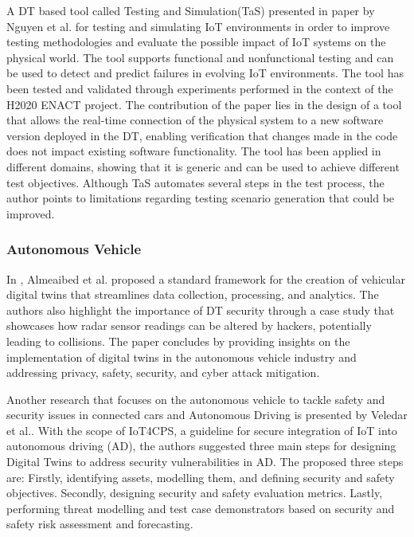 A DT based tool called Testing and Simulation(TaS) presented in\cite{luongnguyenDigitalTwinIoT2022} paper by Nguyen et al. for testing and simulating IoT environments in order to improve testing methodologies and evaluate the possible impact of IoT systems on the physical world. The tool supports functional and nonfunctional testing and can be used to detect and predict failures in evolving IoT environments. The tool has been tested and validated through experiments performed in the context of the H2020 ENACT project. The contribution of the paper lies in the design of a tool that allows the real-time connection of the physical system to a new software version deployed in the DT, enabling verification that changes made in the code does not impact existing software functionality. The tool has been applied in different domains, showing that it is generic and can be used to achieve different test objectives. Although TaS automates several steps in the test process, the author points to limitations regarding testing scenario generation that could be improved.


\subsubsection{Autonomous Vehicle}
In \cite{almeaibedDigitalTwinAnalysis2021}, Almeaibed et al. proposed a standard framework for the creation of vehicular digital twins that streamlines data collection, processing, and analytics. The authors also highlight the importance of DT security through a case study that showcases how radar sensor readings can be altered by hackers, potentially leading to collisions. The paper concludes by providing insights on the implementation of digital twins in the autonomous vehicle industry and addressing privacy, safety, security, and cyber attack mitigation.

Another research that focuses on the autonomous vehicle to tackle safety and security issues in connected cars and Autonomous Driving is presented by Veledar et al.\cite{veledarDigitalTwinsDependability2019}.
With the scope of IoT4CPS, a guideline for secure integration of IoT into autonomous driving (AD), the authors suggested three main steps for designing Digital Twins to address security vulnerabilities in AD. The proposed three steps are: Firstly, identifying assets, modelling them, and defining security and safety objectives. Secondly, designing security and safety evaluation metrics. Lastly, performing threat modelling and test case demonstrators based on security and safety risk assessment and forecasting.

